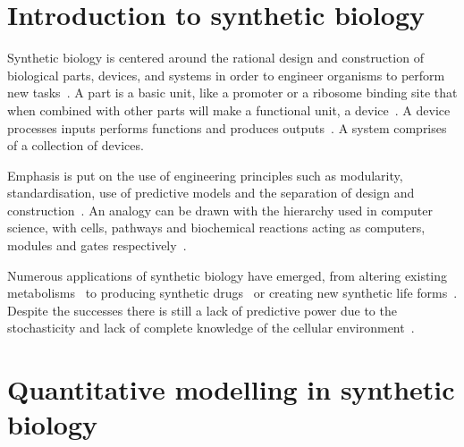 

\section{Introduction to synthetic biology}

Synthetic biology is centered around the rational design and construction of biological parts, devices, and systems in order to engineer organisms to perform new tasks~\autocite{Lu:2009ez, Andrianantoandro:2006bia}. A part is a basic unit, like a promoter or a ribosome binding site that when combined with other parts will make a functional unit, a device~\autocite{Heinemann:2006ht}. A device processes inputs performs functions and produces outputs~\autocite{Andrianantoandro:2006bia}. A system comprises of a collection of devices.     

Emphasis is put on the use of engineering principles such as modularity, standardisation, use of predictive models and the separation of design and construction~\autocite{Agapakis:2009bt, Heinemann:2006ht}. An analogy can be drawn with the hierarchy used in computer science, with cells, pathways and biochemical reactions acting as computers, modules and gates respectively~\autocite{Andrianantoandro:2006bia}. 
       
Numerous applications of synthetic biology have emerged, from altering existing metabolisms~\autocite{Wang:2007kh} to producing synthetic drugs~\autocite{Ro:2006cl} or creating new synthetic life forms~\autocite{Hutchison:2016gg}. Despite the successes there is still a lack of predictive power due to the stochasticity and lack of complete knowledge of the cellular environment~\autocite{Andrianantoandro:2006bia}.



\section{Quantitative modelling in synthetic biology}




